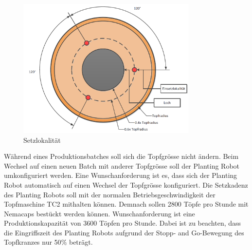 \begin{figure}[H]
	\includegraphics[draft=false,width=0.8\textwidth]{Illustrationen/4-Entwurf/Setzprozess.png}
	\caption{Setzlokalität}
	\label{fig:Setzprozess}
\end{figure}

Während eines Produktionsbatches soll sich die Topfgrösse nicht ändern. Beim Wechsel auf einen neuen Batch mit anderer Topfgrösse soll der Planting Robot umkonfiguriert werden. Eine Wunschanforderung ist es, dass sich der Planting Robot automatisch auf einen Wechsel der Topfgrösse konfiguriert. Die Setzkadenz des Planting Robots soll mit der normalen Betriebsgeschwindigkeit der Topfmaschine TC2 mithalten können. Demnach sollen 2800 Töpfe pro Stunde mit Nemacaps bestückt werden können. Wunschanforderung ist eine Produktionskapazität von 3600 Töpfen pro Stunde. Dabei ist zu beachten, dass die Eingriffszeit des Planting Robots aufgrund der Stopp- and Go-Bewegung des Topfkranzes nur 50$\%$ beträgt.